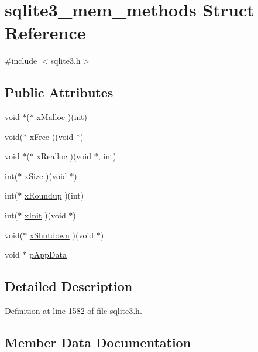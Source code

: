 \hypertarget{structsqlite3__mem__methods}{}\section{sqlite3\+\_\+mem\+\_\+methods Struct Reference}
\label{structsqlite3__mem__methods}


{\ttfamily \#include $<$sqlite3.\+h$>$}

\subsection*{Public Attributes}
\begin{DoxyCompactItemize}
\item 
void $\ast$($\ast$ \mbox{\hyperlink{structsqlite3__mem__methods_a19aee06ad5c1c7041f55725b6adb2b18}{x\+Malloc}} )(int)
\item 
void($\ast$ \mbox{\hyperlink{structsqlite3__mem__methods_a17d4fe3177f86bd7b559ecadaa343ee8}{x\+Free}} )(void $\ast$)
\item 
void $\ast$($\ast$ \mbox{\hyperlink{structsqlite3__mem__methods_a82ef8b50d6b9920c1dadb3257cf36a3a}{x\+Realloc}} )(void $\ast$, int)
\item 
int($\ast$ \mbox{\hyperlink{structsqlite3__mem__methods_a703ec736e9ce21fd43b9602bcd07fa8e}{x\+Size}} )(void $\ast$)
\item 
int($\ast$ \mbox{\hyperlink{structsqlite3__mem__methods_aaf22c6bca12dc6a3f5851e2b6b59835d}{x\+Roundup}} )(int)
\item 
int($\ast$ \mbox{\hyperlink{structsqlite3__mem__methods_a870eddbe27d9062ed2fb49ba13233501}{x\+Init}} )(void $\ast$)
\item 
void($\ast$ \mbox{\hyperlink{structsqlite3__mem__methods_ae3b1f92553e714484515409eefec5c2f}{x\+Shutdown}} )(void $\ast$)
\item 
void $\ast$ \mbox{\hyperlink{structsqlite3__mem__methods_a390f66d08d5a480544e919f64d7713de}{p\+App\+Data}}
\end{DoxyCompactItemize}


\subsection{Detailed Description}


Definition at line 1582 of file sqlite3.\+h.



\subsection{Member Data Documentation}
\mbox{\label{structsqlite3__mem__methods_a390f66d08d5a480544e919f64d7713de}} 
